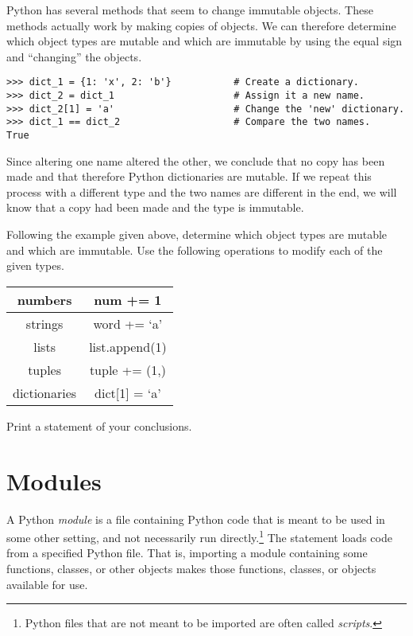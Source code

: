 \begin{problem} %
Python has several methods that seem to change immutable objects.
These methods actually work by making copies of objects.
We can therefore determine which object types are mutable and which are immutable by using the equal sign and ``changing'' the objects.

\begin{lstlisting}
>>> dict_1 = {1: 'x', 2: 'b'}           # Create a dictionary.
>>> dict_2 = dict_1                     # Assign it a new name.
>>> dict_2[1] = 'a'                     # Change the 'new' dictionary.
>>> dict_1 == dict_2                    # Compare the two names.
True
\end{lstlisting}

Since altering one name altered the other, we conclude that no copy has been made and that therefore Python dictionaries are mutable.
If we repeat this process with a different type and the two names are different in the end, we will know that a copy had been made and the type is immutable.

Following the example given above, determine which object types are mutable and which are immutable.
Use the following operations to modify each of the given types.

\begin{center}
\begin{tabular}{|c|c|}
\hline
numbers & num += 1 \\
\hline
strings & word += `a' \\
\hline
lists & list.append(1) \\
\hline
tuples & tuple += (1,) \\
\hline
dictionaries & dict[1] = `a' \\
\hline
\end{tabular}
\end{center}
Print a statement of your conclusions.
\end{problem}

\section*{Modules} %

A Python \emph{module} is a file containing Python code that is meant to be used in some other setting, and not necessarily run directly.\footnote{Python files that are not meant to be imported are often called \emph{scripts}.}
The  statement loads code from a specified Python file.
That is, importing a module containing some functions, classes, or other objects makes those functions, classes, or objects available for use.

